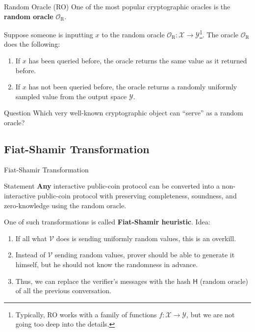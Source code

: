 \documentclass{zkdl-presentation-template}
\begin{document}
    \begin{frame}{Random Oracle (RO)}
        One of the most popular cryptographic oracles is the \textbf{random oracle} $\mathcal{O}_{\text{R}}$.

        \begin{definition}
            Suppose someone is inputting $x$ to the random oracle $\mathcal{O}_{\text{R}}: \mathcal{X} \to \mathcal{Y}$\footnote{Typically, RO works with a family of functions $f: \mathcal{X} \to \mathcal{Y}$, but we are not going too deep into the details.}. The oracle $\mathcal{O}_{\text{R}}$ does the following:\pause
            \begin{enumerate}
                \item If $x$ has been queried before, the oracle returns the same value as it returned before.\pause
                \item If $x$ has not been queried before, the oracle returns a randomly uniformly sampled value from the output space $\mathcal{Y}$.\pause
            \end{enumerate}
        \end{definition}

        \begin{questionblock}{Question}
            Which very well-known cryptographic object can ``serve'' as a random oracle?
        \end{questionblock}
    \end{frame}

    \subsection{Fiat-Shamir Transformation}
    \begin{frame}{Fiat-Shamir Transformation}
        \begin{block}{Statement}
            \textbf{Any} interactive public-coin protocol can be converted into a non-interactive public-coin protocol with preserving completeness, soundness, and zero-knowledge using the random oracle.
        \end{block}

        One of such transformations is called \textbf{Fiat-Shamir heuristic}. Idea:\pause
        \begin{enumerate}
            \item If all what $\mathcal{V}$ does is sending uniformly random values, this is an overkill.\pause
            \item Instead of $\mathcal{V}$ sending random values, prover should be able to generate it himself, but he should not know the randomness in advance.\pause
            \item Thus, we can replace the verifier's messages with the hash $\mathsf{H}$ (random oracle) of all the previous conversation.
        \end{enumerate}
    \end{frame}
\end{document}

